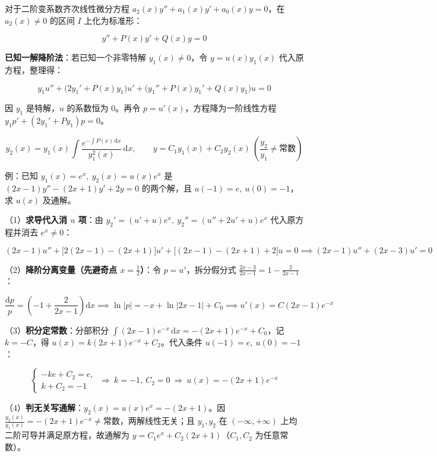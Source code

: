 \documentclass[10pt,a4paper]{ctexart}
\begin{document}

对于二阶变系数齐次线性微分方程 $a_2(x)y''+a_1(x)y'+a_0(x)y=0$，在 $a_2(x)\neq 0$ 的区间 $I$ 上化为标准形：

\[
y''+P(x)y'+Q(x)y=0
\]

\textbf{已知一解降阶法}：若已知一个非零特解 $y_1(x)\neq 0$，令 $y=u(x)y_1(x)$ 代入原方程，整理得：

\[
y_1 u'' + \big(2y_1' + P(x)y_1\big)u' + \big(y_1''+P(x)y_1'+Q(x)y_1\big)u = 0
\]

因 $y_1$ 是特解，$u$ 的系数恒为 $0$。再令 $p=u'(x)$，方程降为一阶线性方程 $y_1 p'+(2y_1'+Py_1)p=0$。

\[
y_2(x)=y_1(x)\int \frac{e^{-\int P(x)\,\mathrm{d}x}}{y_1^2(x)}\,\mathrm{d}x,\qquad y = C_1 y_1(x)+C_2 y_2(x)\ \left(\frac{y_2}{y_1}\neq \text{常数}\right)
\]



例：已知 $y_1(x)=e^x,\ y_2(x)=u(x)e^x$ 是 $(2x-1)y''-(2x+1)y'+2y=0$ 的两个解，且 $u(-1)=e,\ u(0)=-1$，求 $u(x)$ 及通解。

（1）\textbf{求导代入消 $u$ 项}：由 $y_2'=(u'+u)e^x,\ y_2''=(u''+2u'+u)e^x$ 代入原方程并消去 $e^x\neq 0$：

\[
(2x-1)u''+\big[2(2x-1)-(2x+1)\big]u'+\big[(2x-1)-(2x+1)+2\big]u=0 \implies (2x-1)u''+(2x-3)u'=0
\]

（2）\textbf{降阶分离变量（先避奇点 $x=\frac{1}{2}$）}：令 $p=u'$，拆分假分式 $\frac{2x-3}{2x-1}=1-\frac{2}{2x-1}$：

\[
\frac{\mathrm{d}p}{p}=\left(-1+\frac{2}{2x-1}\right)\mathrm{d}x \implies \ln|p|=-x+\ln|2x-1|+C_0 \implies u'(x)=C(2x-1)e^{-x}
\]

（3）\textbf{积分定常数}：分部积分 $\int(2x-1)e^{-x}\,\mathrm{d}x=-(2x+1)e^{-x}+C_0$，记 $k=-C$，得 $u(x)=k(2x+1)e^{-x}+C_2$。代入条件 $u(-1)=e,\ u(0)=-1$：

\[
\begin{cases}-ke+C_2=e,\\ k+C_2=-1\end{cases}\ \Longrightarrow\ k=-1,\ C_2=0\ \Longrightarrow\ u(x)=-(2x+1)e^{-x}
\]

（4）\textbf{判无关写通解}：$y_2(x)=u(x)e^x=-(2x+1)$。因 $\frac{y_2(x)}{y_1(x)}=-(2x+1)e^{-x}\neq\text{常数}$，两解线性无关；且 $y_1,y_2$ 在 $(-\infty,+\infty)$ 上均二阶可导并满足原方程，故通解为 \textbf{$y=C_1 e^x + C_2(2x+1)$}（$C_1,C_2$ 为任意常数）。
\end{document}
